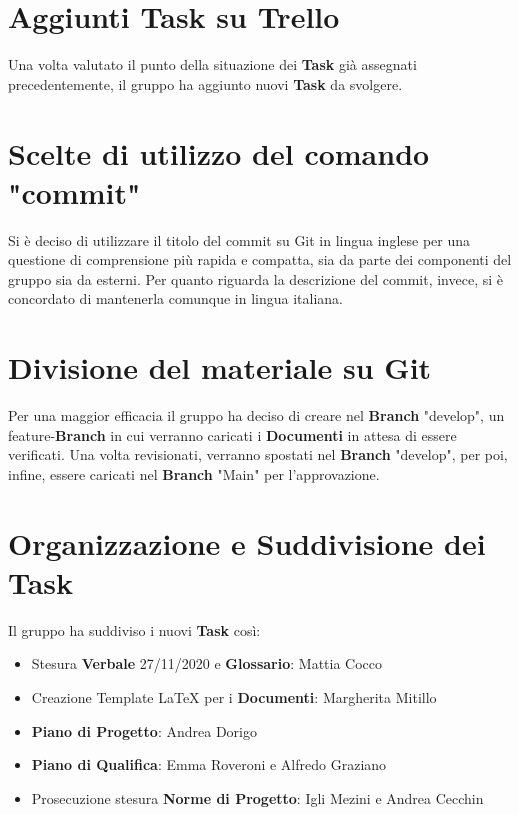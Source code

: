 	\section{Aggiunti Task su Trello}
	Una volta valutato il punto della situazione dei \textbf{Task} già assegnati precedentemente, il gruppo ha aggiunto nuovi \textbf{Task} da svolgere.
	
	\section{Scelte di utilizzo del comando "commit"}
	Si è deciso di utilizzare il titolo del commit su Git in lingua inglese per una questione di comprensione più rapida e compatta, sia da parte dei componenti del gruppo sia da esterni.
	Per quanto riguarda la descrizione del commit, invece, si è concordato di mantenerla comunque in lingua italiana.
	
	\section{Divisione del materiale su Git}
	Per una maggior efficacia il gruppo ha deciso di creare nel \textbf{Branch} "develop", un feature-\textbf{Branch} in cui verranno caricati i \textbf{Documenti}
	in attesa di essere verificati. 
	Una volta revisionati, verranno spostati nel \textbf{Branch} "develop", per poi, infine, essere caricati nel \textbf{Branch}  "Main" per l'approvazione.
	
	\section{Organizzazione e Suddivisione dei Task}
	Il gruppo ha suddiviso i nuovi \textbf{Task} così:
	\begin{itemize}
		\item Stesura \textbf{Verbale} 27/11/2020 e \textbf{Glossario}: Mattia Cocco
		\item Creazione Template LaTeX per i \textbf{Documenti}: Margherita Mitillo
		\item \textbf{Piano di Progetto}: Andrea Dorigo
		\item \textbf{Piano di Qualifica}: Emma Roveroni e Alfredo Graziano
		\item Prosecuzione stesura \textbf{Norme di Progetto}: Igli Mezini e Andrea Cecchin		
	\end{itemize}
	